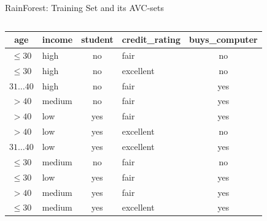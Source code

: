 \begin{frame}{RainForest: Training Set and its AVC-sets}
  \begin{columns}
    \begin{column}{0.6\textwidth}
      \begin{tabular}{|c|l|c|l|c|}
        \hline
        \cellcolor{blue!20}age & \cellcolor{blue!20}income & \cellcolor{blue!20}student & \cellcolor{blue!20}credit\_rating & \cellcolor{brown!20}buys\_computer \\\hline
        \cellcolor{yellow!20}$\leq30$ & \cellcolor{yellow!20}high & \cellcolor{yellow!20}no & \cellcolor{yellow!20}fair & \cellcolor{red!20}no \\\hline
        \cellcolor{yellow!20}$\leq30$ & \cellcolor{yellow!20}high & \cellcolor{yellow!20}no & \cellcolor{yellow!20}excellent & \cellcolor{red!20}no \\\hline
        \cellcolor{yellow!20}$31\ldots40$ & \cellcolor{yellow!20}high & \cellcolor{yellow!20}no & \cellcolor{yellow!20}fair & \cellcolor{green!20}yes \\\hline
        \cellcolor{yellow!20}$>40$ & \cellcolor{yellow!20}medium & \cellcolor{yellow!20}no & \cellcolor{yellow!20}fair & \cellcolor{green!20}yes \\\hline
        \cellcolor{yellow!20}$>40$ & \cellcolor{yellow!20}low & \cellcolor{yellow!20}yes & \cellcolor{yellow!20}fair & \cellcolor{green!20}yes \\\hline
        \cellcolor{yellow!20}$>40$ & \cellcolor{yellow!20}low & \cellcolor{yellow!20}yes & \cellcolor{yellow!20}excellent & \cellcolor{red!20}no \\\hline
        \cellcolor{yellow!20}$31\ldots40$ & \cellcolor{yellow!20}low & \cellcolor{yellow!20}yes & \cellcolor{yellow!20}excellent & \cellcolor{green!20}yes \\\hline
        \cellcolor{yellow!20}$\leq30$ & \cellcolor{yellow!20}medium & \cellcolor{yellow!20}no & \cellcolor{yellow!20}fair & \cellcolor{red!20}no \\\hline
        \cellcolor{yellow!20}$\leq30$ & \cellcolor{yellow!20}low & \cellcolor{yellow!20}yes & \cellcolor{yellow!20}fair & \cellcolor{green!20}yes \\\hline
        \cellcolor{yellow!20}$>40$ & \cellcolor{yellow!20}medium & \cellcolor{yellow!20}yes & \cellcolor{yellow!20}fair & \cellcolor{green!20}yes \\\hline
        \cellcolor{yellow!20}$\leq30$ & \cellcolor{yellow!20}medium & \cellcolor{yellow!20}yes & \cellcolor{yellow!20}excellent & \cellcolor{green!20}yes \\\hline

\end{tabular}
\end{column}
\end{columns}
\end{frame}
